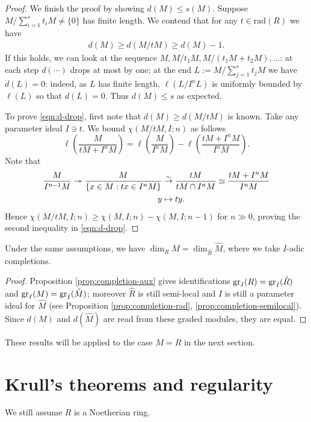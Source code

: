 \begin{proof}
	We finish the proof by showing $d(M) \leq s(M)$. Suppose $M/\sum_{i=1}^s t_i M \neq \{0\}$ has finite length. We contend that for any $t \in \text{rad}(R)$ we have
	\begin{gather}\label{eqn:d-drop}
		d(M) \geq d(M/tM) \geq d(M)-1.
	\end{gather}
	If this holds, we can look at the sequence $M, M/t_1 M, M/(t_1M + t_2 M), \ldots$: at each step $d(\cdots)$ drops at most by one; at the end $L := M/\sum_{j=1}^s t_j M$ we have $d(L)=0$: indeed, as $L$ has finite length, $\ell(L/I^n L)$ is uniformly bounded by $\ell(L)$ so that $d(L)=0$. Thus $d(M) \leq s$ as expected.
	
	To prove \eqref{eqn:d-drop}, first note that $d(M) \geq d(M/tM)$ is known. Take any parameter ideal $I \ni t$. We bound $\chi(M/tM, I; n)$ as follows
	\[ \ell\left( \frac{M}{tM + I^n M} \right) = \ell\left( \frac{M}{I^n M} \right) - \ell\left( \frac{tM + I^n M}{I^n M} \right). \]
	Note that
	\begin{align*}
		\frac{M}{I^{n-1} M}\twoheadrightarrow \frac{M}{ \{ x \in M : tx \in I^n M \} } & \stackrel{\sim}{\rightarrow} \frac{tM}{tM \cap I^n M} \simeq \frac{tM + I^n M}{I^n M} \\
		y & \mapsto ty.
	\end{align*}
	Hence $\chi(M/tM, I; n) \geq \chi(M, I; n) - \chi(M, I; n-1)$ for $n \gg 0$, proving the second inequality in \eqref{eqn:d-drop}.
\end{proof}

\begin{corollary}
	Under the same assumptions, we have $\dim_R M = \dim_{\hat{R}} \hat{M}$, where we take $I$-adic completions.
\end{corollary}
\begin{proof}
	Proposition \ref{prop:completion-aux} gives identifications $\operatorname{gr}_I(R) = \operatorname{gr}_{\hat{I}}(\hat{R})$ and $\operatorname{gr}_I(M) = \operatorname{gr}_{\hat{I}}(\hat{M})$; moreover $\hat{R}$ is still semi-local and $\hat{I}$ is still a parameter ideal for $\hat{M}$ (see Proposition \ref{prop:completion-rad}, \ref{prop:completion-semilocal}). Since $d(M)$ and $d(\hat{M})$ are read from these graded modules, they are equal.
\end{proof}

These results will be applied to the case $M=R$ in the next section.

\section{Krull's theorems and regularity}
We still assume $R$ is a Noetherian ring.

